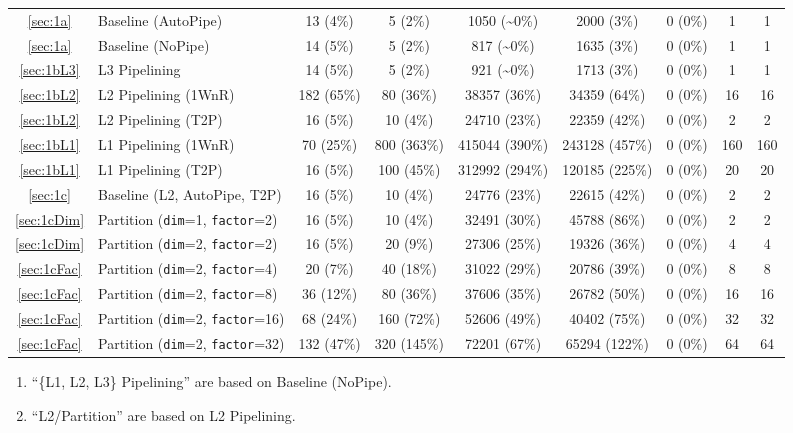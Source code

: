 {\begin{tabularx}{\textwidth}{cl*{5}{c}*{2}{C}}
    \midrule
    \ref{sec:1a}                      & Baseline (AutoPipe) & 13 (4\%) & 5 (2\%) & 1050 (\textasciitilde 0\%) & 2000 (3\%) & 0 (0\%) & 1 & 1 \\
\ref{sec:1a}       & Baseline (NoPipe) & 14 (5\%) & 5 (2\%) & 817 (\textasciitilde 0\%) & 1635 (3\%) & 0 (0\%) & 1 & 1 \\
\ref{sec:1bL3}                          & L3 Pipelining & 14 (5\%) & 5 (2\%) & 921 (\textasciitilde 0\%) & 1713 (3\%) & 0 (0\%) & 1 & 1 \\
\ref{sec:1bL2}                     & L2 Pipelining (1WnR) & 182 (65\%) & 80 (36\%) & 38357 (36\%) & 34359 (64\%) & 0 (0\%) & 16 & 16 \\
\ref{sec:1bL2}                     & L2 Pipelining (T2P) & 16 (5\%) & 10 (4\%) & 24710 (23\%) & 22359 (42\%) & 0 (0\%) & 2 & 2 \\
\ref{sec:1bL1}                     & L1 Pipelining (1WnR) & 70 (25\%) & 800 (363\%) & 415044 (390\%) & 243128 (457\%) & 0 (0\%) & 160 & 160 \\
\ref{sec:1bL1}                      & L1 Pipelining (T2P) & 16 (5\%) & 100 (45\%) & 312992 (294\%) & 120185 (225\%) & 0 (0\%) & 20 & 20 \\
\ref{sec:1c}  & Baseline (L2, AutoPipe, T2P) & 16 (5\%) & 10 (4\%) & 24776 (23\%) & 22615 (42\%) & 0 (0\%) & 2 & 2 \\
\ref{sec:1cDim}                     & Partition (\texttt{dim}=1, \texttt{factor}=2) & 16 (5\%) & 10 (4\%) & 32491 (30\%) & 45788 (86\%) & 0 (0\%) & 2 & 2 \\
\ref{sec:1cDim}    & Partition (\texttt{dim}=2, \texttt{factor}=2) & 16 (5\%) & 20 (9\%) & 27306 (25\%) & 19326 (36\%) & 0 (0\%) & 4 & 4 \\
\ref{sec:1cFac}                     & Partition (\texttt{dim}=2, \texttt{factor}=4) & 20 (7\%) & 40 (18\%) & 31022 (29\%) & 20786 (39\%) & 0 (0\%) & 8 & 8 \\
\ref{sec:1cFac}                     & Partition (\texttt{dim}=2, \texttt{factor}=8) & 36 (12\%) & 80 (36\%) & 37606 (35\%) & 26782 (50\%) & 0 (0\%) & 16 & 16 \\
\ref{sec:1cFac}   & Partition (\texttt{dim}=2, \texttt{factor}=16) & 68 (24\%) & 160 (72\%) & 52606 (49\%) & 40402 (75\%) & 0 (0\%) & 32 & 32 \\
\ref{sec:1cFac}                    & Partition (\texttt{dim}=2, \texttt{factor}=32) & 132 (47\%) & 320 (145\%) & 72201 (67\%) & 65294 (122\%) & 0 (0\%) & 64 & 64 \\
    \bottomrule
\end{tabularx}
}

\begin{enumerate}[nosep]
    \footnotesize
    \item ``\{L1, L2, L3\} Pipelining'' are based on Baseline (NoPipe).
    \item ``L2/Partition'' are based on L2 Pipelining.
\end{enumerate}